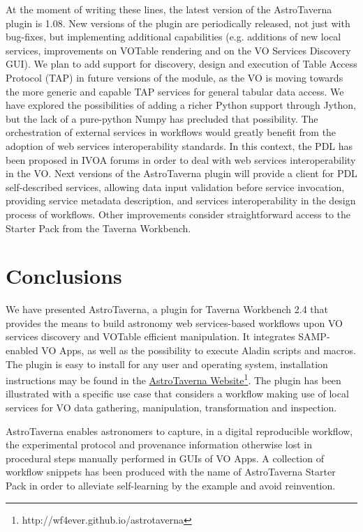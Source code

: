 \documentclass{aa}
\begin{document}
At the moment of writing these lines, the latest version of the AstroTaverna plugin is 1.08. New versions of the plugin are periodically released, not just with bug-fixes, but implementing additional capabilities (e.g. additions of new local services, improvements on VOTable rendering and on the VO Services Discovery GUI). We plan to add support for discovery, design and execution of Table Access Protocol (TAP) in future versions of the module, as the VO is moving towards the more generic and capable TAP services for general tabular data access. We have explored the possibilities of adding a richer Python support through Jython, but the lack of a pure-python Numpy has precluded that possibility. The orchestration of external services in workflows would greatly benefit from the adoption of web services interoperability standards. In this context, the PDL \citep[Parameter Description Language;][]{Zwolf2013} has been proposed in IVOA forums in order to deal with web services interoperability in the VO. Next versions of the AstroTaverna plugin will provide a client for PDL self-described services, allowing data input validation before service invocation, providing service metadata description, and services interoperability in the design process of workflows. Other improvements consider  straightforward access to the Starter Pack from the Taverna Workbench. 

\section{Conclusions}
\label{Conclusions}

We have presented AstroTaverna, a plugin for Taverna Workbench 2.4 that provides the means to build astronomy web services-based workflows upon VO services discovery and VOTable efficient manipulation. It integrates SAMP-enabled VO Apps, as well as the possibility to execute Aladin scripts and macros. The plugin is easy to install for any user and operating system, installation instructions may be found in the \href{http://wf4ever.github.io/astrotaverna}{AstroTaverna Website}\footnote{http://wf4ever.github.io/astrotaverna}. The plugin has been illustrated with a specific use case that considers a workflow making use of local services for VO data gathering, manipulation, transformation and inspection.

AstroTaverna  enables astronomers to capture, in a digital reproducible workflow, the experimental protocol and provenance information otherwise lost in procedural steps manually performed in GUIs of VO Apps. A collection of workflow snippets has been produced with the name of AstroTaverna Starter Pack in order to alleviate self-learning by the example and avoid reinvention.
\end{document}
